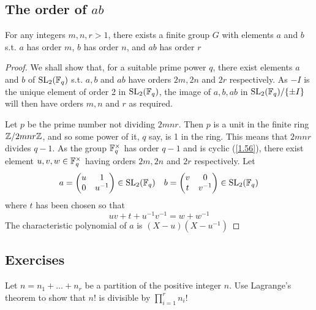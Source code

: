 \documentclass[11pt]{article}
\begin{document}
\subsection{The order of \texorpdfstring{\(ab\)}{ab}}
\label{sec:orgc81f86b}
\begin{theorem}[]
For any integers \(m,n,r>1\), there exists a finite group \(G\) with elements \(a\) and \(b\)
s.t. \(a\) has order \(m\), \(b\) has order \(n\), and \(ab\) has order \(r\)
\end{theorem}

\begin{proof}
We shall show that, for a suitable prime power \(q\), there exist elements \(a\) and \(b\)
of \(\operatorname{SL}_2(\mathbb{F}_q)\) s.t. \(a,b\) and \(ab\) have orders \(2m,2n\) and \(2r\) respectively.
As \(-I\) is the unique element of order 2 in \(\operatorname{SL}_2(\mathbb{F}_q)\), the image of \(a,b,ab\)
in \(\operatorname{SL}_2(\mathbb{F}_q)/\{\pm I\}\) will then have orders \(m,n\) and \(r\) as required.

Let \(p\) be the prime number not dividing \(2mnr\). Then \(p\) is a unit in the finite
ring \(\mathbb{Z}/2mnr\mathbb{Z}\), and so some power of it, \(q\) say, is 1 in the ring. This means that \(2mnr\)
divides \(q-1\). As the group \(\mathbb{F}_q^\times\) has order \(q-1\) and is cyclic (\ref{1.56}), there exist
element \(u,v,w\in\mathbb{F}_q^{\times}\) having orders \(2m,2n\) and \(2r\) respectively. Let
\begin{equation*}
a=
\begin{pmatrix}
u&1\\0&u^{-1}
\end{pmatrix}\in\operatorname{SL}_2(\mathbb{F}_q)\quad b=
\begin{pmatrix}
v&0\\t&v^{-1}
\end{pmatrix}\in\operatorname{SL}_2(\mathbb{F}_q)
\end{equation*}
where \(t\) has been chosen so that
\begin{equation*}
uv+t+u^{-1}v^{-1}=w+w^{-1}
\end{equation*}
The characteristic polynomial of \(a\) is \((X-u)(X-u^{-1})\)
\end{proof}

\label{SKIP}
\subsection{Exercises}
\label{sec:org203ce9f}
\begin{exercise}
\label{ex1.4}
Let \(n=n_1+\dots+n_r\) be a partition of the positive integer \(n\). Use Lagrange's theorem to show
that \(n!\) is divisible by \(\prod_{i=1}^rn_i!\)
\end{exercise}
\end{document}
